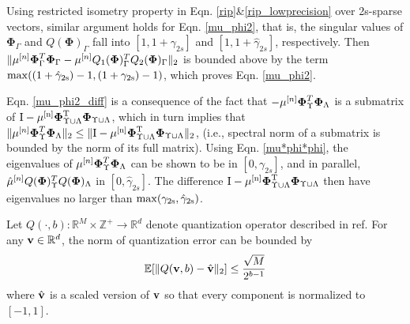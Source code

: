 \documentclass{article}
\begin{document}
Using restricted isometry property in Eqn. \ref{rip}\&\ref{rip_lowprecision} over 2s-sparse vectors, similar argument holds for Eqn. \ref{mu_phi2}, that is, the singular values of $\boldsymbol{\Phi}_{\Gamma}$ and $Q(\boldsymbol{\Phi})_{\Gamma}$ fall into $[1, 1+ \gamma_{2s}]$ and $[1, 1+ \hat{\gamma}_{2s}]$, respectively. Then $\|\mu^{[n]}\boldsymbol{\Phi}_{\Gamma}^T\boldsymbol{{\bf \Phi}}_{\Gamma} - \mu^{[n]}Q_1(\boldsymbol{\Phi})_{\Gamma}^TQ_2(\boldsymbol{\Phi})_{\Gamma}\|_2$ is bounded above by the term $\rm{max}((1+\hat{\gamma}_{2s})-1, (1+\gamma_{2s})-1)$, which proves Eqn. \ref{mu_phi2}. 

Eqn. \ref{mu_phi2_diff} is a consequence of the fact that $-\mu^{[n]}\boldsymbol{{\bf \Phi}}_{\Upsilon}^T\boldsymbol{{\bf \Phi}}_{\Lambda}$ is a submatrix of $\rm{I}-\mu^{[n]}\boldsymbol{{\bf \Phi}}_{\Upsilon \cup \Lambda}^T\boldsymbol{{\bf \Phi}}_{\Upsilon \cup \Lambda}$, which in turn implies that $\|\mu^{[n]}\boldsymbol{{\bf \Phi}}_{\Upsilon}^T\boldsymbol{{\bf \Phi}}_{\Lambda}\|_2 \leq \|\rm{I}-\mu^{[n]}\boldsymbol{{\bf \Phi}}_{\Upsilon \cup \Lambda}^T\boldsymbol{{\bf \Phi}}_{\Upsilon \cup \Lambda} \|_2$, (i.e., spectral norm of a submatrix is bounded by the norm of its full matrix). Using Eqn. \ref{mu*phi*phi}, the eigenvalues of $\mu^{[n]}\boldsymbol{{\bf \Phi}}_{\Upsilon}^T\boldsymbol{{\bf \Phi}}_{\Lambda}$ can be shown to be in $[0, \gamma_{2s}]$, and in parallel, $\hat{\mu}^{[n]}Q(\boldsymbol{{\bf \Phi}})_{\Upsilon}^TQ(\boldsymbol{{\bf \Phi}})_{\Lambda}$ in $[0, \hat{\gamma}_{2s}]$. The difference $\rm{I}-\mu^{[n]}\boldsymbol{{\bf \Phi}}_{\Upsilon \cup \Lambda}^T\boldsymbol{{\bf \Phi}}_{\Upsilon \cup \Lambda}$ then have eigenvalues no larger than $\rm{max}(\gamma_{2s}, \hat{\gamma}_{2s})$.
\begin{lemma}\label{lemma_on_quantized_vector}
Let $Q(\cdot, b): \mathbb{R}^M\times \mathbb{Z}^+ \rightarrow \mathbb{R}^d$ denote quantization operator described in ref. For any ${\bf v}\in \mathbb{R}^d$, the norm of quantization error can be bounded by
\begin{equation}\label{quantization_error}
    \mathbb{E}[\| Q({\bf v}, b) - \hat{\bf v}\|_2] \leq \frac{\sqrt{M}}{2^{b-1}}
\end{equation}
where $\hat{\bf v}$ is a scaled version of ${\bf v}$ so that every component is normalized to $[-1, 1]$.
\end{lemma}
\end{document}
